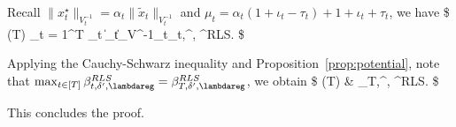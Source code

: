 Recall $\|x^{\star}_t\|_{V^{-1}_t} = \alpha_t \|\tilde{x}_t\|_{V^{-1}_t}$ and $\mu_t  =  \alpha_t(1+\iota_t -\tau_t)+1+\iota_t+\tau_t$, we have 
\$
\cR(T)  \leq \sum_{t = 1}^T   \mu_t \|_t\|_{V^{-1}_t}\beta_{t,\delta^\prime, \lambdareg}^{RLS}.
\$ 

Applying the Cauchy-Schwarz inequality and Proposition~\ref{prop:potential}, note that $\max_{t\in[T]}  \beta_{t,\delta^\prime, \lambdareg}^{RLS} = \beta_{T,\delta^\prime, \lambdareg}^{RLS}$, we obtain 
\$
\cR(T) &\leq   {}  \leq {}    \beta_{T,\delta^\prime, \lambdareg}^{RLS}.
\$


This concludes the proof.
\endproof

